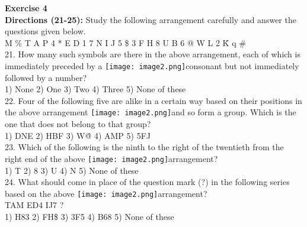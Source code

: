 \documentclass[
]{article}
\begin{document}
\textbf{Exercise 4}\\
\textbf{Directions (21-25):} Study the following arrangement carefully and answer the questions given
below.\\
M \% T A P 4 * E D 1 7 N I J 5 \$ 3 F H 8 U B 6 @ W L 2 \^ K q \#\\
21. How many such symbols are there in the above arrangement, each of which is immediately preceded by a \texttt{[image: image2.png]}consonant but not immediately followed by a number?\\
1) None \hspace{2mm}2) One \hspace{2mm}3) Two \hspace{2mm}4) Three \hspace{2mm}5) None of these\\

22. Four of the following five are alike in a certain way based on their positions in the above arrangement \texttt{[image: image2.png]}and so form a group. Which is the one that does not belong to that group?\\
1) DNE \hspace{2mm}2) HBF \hspace{2mm}3) W\^@ \hspace{2mm}4) AMP \hspace{2mm}5) 5FJ\\

23. Which of the following is the ninth to the right of the twentieth from the right end of the above \texttt{[image: image2.png]}arrangement?\\
1) T \hspace{2mm}2) 8 \hspace{2mm}3) U \hspace{2mm}4) N \hspace{2mm}5) None of these\\

24. What should come in place of the question mark (?) in the following series based on the above \texttt{[image: image2.png]}arrangement?\\
TAM ED4 IJ7 ?\\
1) H83 \hspace{2mm}2) FH\$ \hspace{2mm}3) 3F5 \hspace{2mm}4) B68 \hspace{2mm}5) None of these\\
\end{document}

